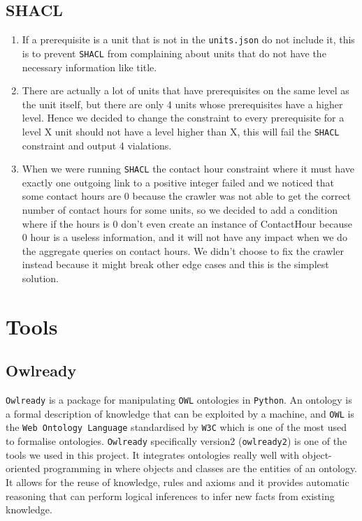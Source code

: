 \documentclass{article}
\begin{document}
\subsection*{SHACL}
\begin{enumerate}
	\item If a prerequisite is a unit that is not in the \verb|units.json| do not include it, this is to prevent \verb|SHACL| from complaining about units that do not have the necessary information like title.
	\item There are actually a lot of units that have prerequisites on the same level as the unit itself, but there are only 4 units whose prerequisites have a higher level. Hence we decided to change the constraint to every prerequisite for a level X unit should not have a level higher than X, this will fail the \verb|SHACL| constraint and output 4 vialations.
	\item When we were running \verb|SHACL| the contact hour constraint where it must have exactly one outgoing link to a positive integer failed and we noticed that some contact hours are 0 because the crawler was not able to get the correct number of contact hours for some units, so we decided to add a condition where if the hours is 0 don't even create an instance of ContactHour because 0 hour is a useless information, and it will not have any impact when we do the aggregate queries on contact hours. We didn't choose to fix the crawler instead because it might break other edge cases and this is the simplest solution.
\end{enumerate}

\section*{Tools}
\subsection*{Owlready}
\verb|Owlready| is a package for manipulating \verb|OWL| ontologies in \verb|Python|. An ontology is a formal description of knowledge that can be exploited by a machine, and \verb|OWL| is the \verb|Web Ontology Language| standardised by \verb|W3C| which is one of the most used to formalise ontologies. \verb|Owlready| specifically version2 (\verb|owlready2|) is one of the tools we used in this project. It integrates ontologies really well with object-oriented programming in where objects and classes are the entities of an ontology. It allows for the reuse of knowledge, rules and axioms and it provides automatic reasoning that can perform logical inferences to infer new facts from existing knowledge.
\end{document}
